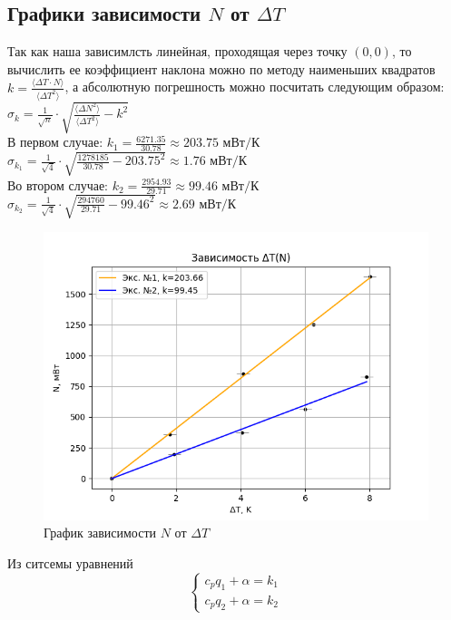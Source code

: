 \documentclass[a4paper, 10pt, twocolumn]{article}
\begin{document}
\subsection{Графики зависимости $N$ от $\Delta T$}
    Так как наша зависимлсть линейная, проходящая через точку $(0,0)$, то вычислить ее коэффициент наклона
    можно по методу наименьших квадратов $k = \frac{\langle \Delta T \cdot N \rangle}{\langle \Delta T^2 \rangle}$,
    а абсолютную погрешность можно посчитать следующим образом: $\sigma_k = \frac{1}{\sqrt{n}} \cdot 
    \sqrt{\frac{\langle \Delta N^2 \rangle}{\langle \Delta T^2 \rangle} - k^2}$ \\
    В первом случае: $k_1 = \frac{6271.35}{30.78} \approx 203.75 \text{ мВт/К}$ \\
    $\sigma_{k_1} = \frac{1}{\sqrt{4}} \cdot \sqrt{\frac{1278185}{30.78} - 203.75^2} \approx 1.76 \text{ мВт/К}$ \\
    Во втором случае: $k_2 = \frac{2954.93}{29.71} \approx 99.46 \text{ мВт/К}$
    $\sigma_{k_2} = \frac{1}{\sqrt{4}} \cdot \sqrt{\frac{294760}{29.71} - 99.46^2} \approx 2.69 \text{ мВт/К}$ \\
    \begin{figure}[H]
        \centering
        \includegraphics[width=1\linewidth]{graphs/figure1.png}
        \begin{center}
            \caption{График зависимости $N$ от $\Delta T$}
        \end{center}
    \end{figure}
    Из ситсемы уравнений 
    $$\begin{cases}
        c_{p}q_1 +\alpha = k_1 \\
        c_{p}q_2 +\alpha = k_2
    \end{cases}$$
\end{document}

